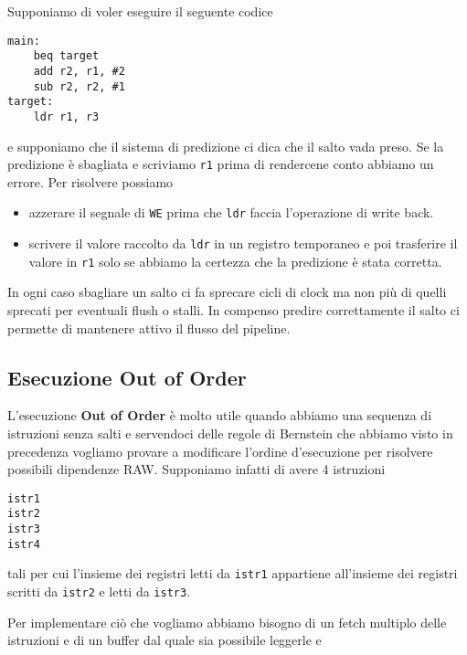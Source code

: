 Supponiamo di voler eseguire il seguente codice
\begin{verbatim}
main:
	beq target
	add r2, r1, #2
	sub r2, r2, #1
target:
	ldr r1, r3
\end{verbatim}
e supponiamo che il sistema di predizione ci dica che il salto vada preso. Se la predizione è
sbagliata e scriviamo \verb|r1| prima di rendercene conto abbiamo un errore. Per risolvere possiamo
\begin{itemize}
	\item azzerare il segnale di \verb|WE| prima che \verb|ldr| faccia l'operazione di write back.
	\item scrivere il valore raccolto da \verb|ldr| in un registro temporaneo e poi trasferire il
	      valore in \verb|r1| solo se abbiamo la certezza che la predizione è stata corretta.
\end{itemize}
In ogni caso sbagliare un salto ci fa sprecare cicli di clock ma non più di quelli sprecati per
eventuali flush o stalli. In compenso predire correttamente il salto ci permette di mantenere
attivo il flusso del pipeline.

\subsection{Esecuzione Out of Order}
L'esecuzione \textbf{Out of Order} è molto utile quando abbiamo una sequenza di istruzioni senza
salti e servendoci delle regole di Bernstein che abbiamo visto in precedenza vogliamo provare a
modificare l'ordine d'esecuzione per risolvere possibili dipendenze RAW. Supponiamo infatti di
avere 4 istruzioni
\begin{verbatim}
istr1
istr2
istr3
istr4
\end{verbatim}
tali per cui l'insieme dei registri letti da \verb|istr1| appartiene all'insieme dei registri
scritti da \verb|istr2| e letti da \verb|istr3|.

Per implementare ciò che vogliamo abbiamo bisogno di un fetch multiplo delle istruzioni e di un
buffer dal quale sia possibile leggerle e